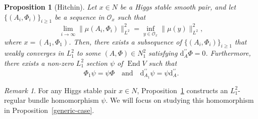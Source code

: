 \documentclass[a4paper]{amsart}
\newtheorem{prop}[theorem]{Proposition}
\theoremstyle{definition}
\theoremstyle{remark}
\newtheorem{remark}[theorem]{Remark}
\numberwithin{equation}{section}
\begin{document}
\begin{prop}[Hitchin]\label{w-converge}
Let $x \in N$ be a Higgs stable smooth pair, and let $\big\{(A_i, \Phi_i)\big\}_{i \geq 1}$ be a sequence in $\mathcal{O}_x$ such that
\[
\lim_{i \to \infty} \|\mu(A_i, \Phi_i)\|_{L^2}^2 = \inf_{y \in \mathcal{O}_x} \|\mu(y)\|_{L^2}^2,
\]
where $x = (A_1, \Phi_1)$. Then, there exists a subsequence of $\big\{(A_i, \Phi_i)\big\}_{i \geq 1}$ that weakly converges in $L_1^2$ to some $(A, \Phi) \in N_1^2$ satisfying $\mathrm{d}_A^{\prime\prime} \Phi = 0$. Furthermore, there exists a non-zero $L_1^2$ section $\psi$ of $\operatorname{End} V$ such that
\[
\Phi_1 \psi = \psi \Phi \quad \text{and} \quad \mathrm{d}_{A_1}^{\prime\prime} \psi = \psi \mathrm{d}_{A}^{\prime\prime}.
\]
\end{prop}

\begin{remark}
For any Higgs stable pair $x \in N$, Proposition~\ref{w-converge} constructs an $L_1^2$-regular bundle homomorphism $\psi$. We will focus on studying this homomorphism in Proposition~\ref{generic-case}.
\end{remark}
\end{document}
